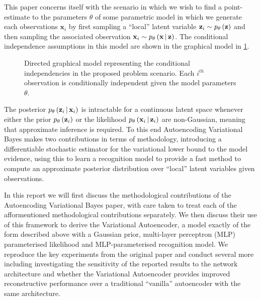 \documentclass[../report.tex]{subfiles}
\begin{document}
This paper concerns itself with the scenario in which we wish to find a point-estimate to the parameters $\theta$ of some parametric model in which we generate each observations $\mathbf{x}_i$ by first sampling a ``local'' latent variable $\mathbf{z}_i \sim p_\theta \left( \mathbf{z}\right)$ and then sampling the associated observation $\mathbf{x}_i \sim p_\theta \left(\mathbf{x} \, \middle\vert \, \mathbf{z} \right)$. The conditional independence assumptions in this model are shown in the graphical model in \cref{fig:graph}.

\begin{figure}[!htbp]
\centering
{}
\caption{\label{fig:graph}Directed graphical model representing the conditional independencies in the proposed problem scenario. Each $i^{th}$ observation is conditionally independent given the model parameters $\theta$.}
\end{figure}

The posterior $p_\theta \left(\mathbf{z}_i \, \middle\vert \, \mathbf{x}_i \right)$ is intractable for a continuous latent space whenever either the prior $p_\theta \left( \mathbf{z}_i\right)$ or the likelihood $p_\theta \left(\mathbf{x}_i \, \middle\vert \, \mathbf{z}_i \right)$ are non-Gaussian, meaning that approximate inference is required. To this end Autoencoding Variational Bayes makes two contributions in terms of methodology, introducing a differentiable stochastic estimator for the variational lower bound to the model evidence, using this to learn a recognition model to provide a fast method to compute an approximate posterior distribution over ``local'' latent variables given observations.

In this report we will first discuss the methodological contributions of the Autoencoding Variational Bayes paper, with care taken to treat each of the afformentioned methodological contributions separately. We then discuss their use of this framework to derive the Variational Autoencoder, a model exactly of the form described above with a Gaussian prior, multi-layer perceptron (MLP) parameterised likelihood and MLP-parameterised recognition model. We reproduce the key experiments from the original paper and conduct several more including investigating the sensitivity of the reported results to the network architecture and whether the Variational Autoencoder provides improved reconstructive performance over a traditional ``vanilla'' autoencoder with the same architecture.
\end{document}
